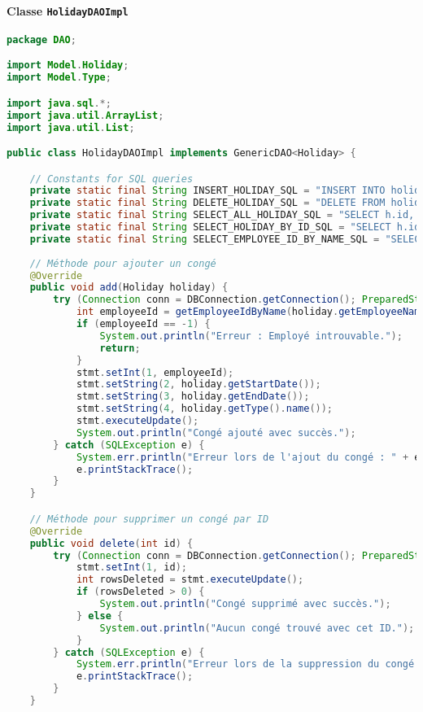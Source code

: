 \documentclass[a4paper,12pt]{article}
\begin{document}
\paragraph{Classe \texttt{HolidayDAOImpl}}
\begin{lstlisting}[language=Java, caption={DAO HolidayDAOImpl}, label={lst:holidayDAOImpl}]
package DAO;

import Model.Holiday;
import Model.Type;

import java.sql.*;
import java.util.ArrayList;
import java.util.List;

public class HolidayDAOImpl implements GenericDAO<Holiday> {

    // Constants for SQL queries
    private static final String INSERT_HOLIDAY_SQL = "INSERT INTO holiday (employeeId, startDate, endDate, type) VALUES (?, ?, ?, ?)";
    private static final String DELETE_HOLIDAY_SQL = "DELETE FROM holiday WHERE id = ?";
    private static final String SELECT_ALL_HOLIDAY_SQL = "SELECT h.id, CONCAT(e.nom, ' ', e.prenom) AS employeeName, h.startDate, h.endDate, h.type FROM holiday h JOIN employe e ON h.employeeId = e.id";
    private static final String SELECT_HOLIDAY_BY_ID_SQL = "SELECT h.id, CONCAT(e.nom, ' ', e.prenom) AS employeeName, h.startDate, h.endDate, h.type FROM holiday h JOIN employe e ON h.employeeId = e.id WHERE h.id = ?";
    private static final String SELECT_EMPLOYEE_ID_BY_NAME_SQL = "SELECT id FROM employe WHERE CONCAT(nom, ' ', prenom) = ?";
    
    // Méthode pour ajouter un congé
    @Override
    public void add(Holiday holiday) {
        try (Connection conn = DBConnection.getConnection(); PreparedStatement stmt = conn.prepareStatement(INSERT_HOLIDAY_SQL)) {
            int employeeId = getEmployeeIdByName(holiday.getEmployeeName());
            if (employeeId == -1) {
                System.out.println("Erreur : Employé introuvable.");
                return;
            }
            stmt.setInt(1, employeeId);
            stmt.setString(2, holiday.getStartDate());
            stmt.setString(3, holiday.getEndDate());
            stmt.setString(4, holiday.getType().name());
            stmt.executeUpdate();
            System.out.println("Congé ajouté avec succès.");
        } catch (SQLException e) {
            System.err.println("Erreur lors de l'ajout du congé : " + e.getMessage());
            e.printStackTrace();
        }
    }

    // Méthode pour supprimer un congé par ID
    @Override
    public void delete(int id) {
        try (Connection conn = DBConnection.getConnection(); PreparedStatement stmt = conn.prepareStatement(DELETE_HOLIDAY_SQL)) {
            stmt.setInt(1, id);
            int rowsDeleted = stmt.executeUpdate();
            if (rowsDeleted > 0) {
                System.out.println("Congé supprimé avec succès.");
            } else {
                System.out.println("Aucun congé trouvé avec cet ID.");
            }
        } catch (SQLException e) {
            System.err.println("Erreur lors de la suppression du congé : " + e.getMessage());
            e.printStackTrace();
        }
    }


\end{lstlisting}
\end{document}
